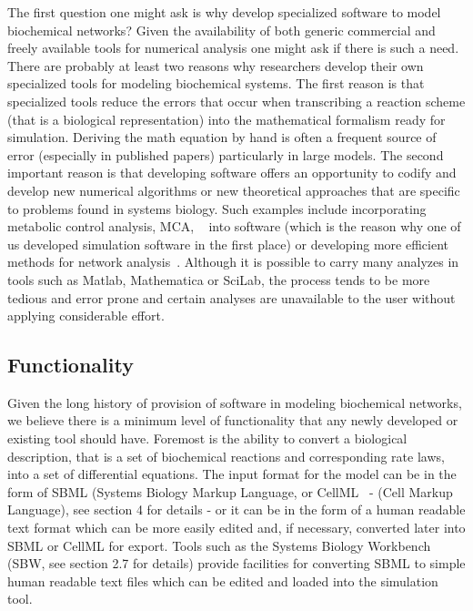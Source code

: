 \documentclass[12pt]{article}
\begin{document}
The first question one might ask is why develop specialized software
to model biochemical networks? Given the availability of both
generic commercial and freely available tools for numerical analysis
one might ask if there is such a need. There are probably at least
two reasons why researchers develop their own specialized tools for
modeling biochemical systems. The first reason is that specialized
tools reduce the errors that occur when transcribing a reaction
scheme (that is a biological representation) into the mathematical
formalism ready for simulation. Deriving the math equation by hand is often a frequent source of error (especially in published papers) particularly in large models. The second important reason is that developing software offers an opportunity to codify and develop new numerical algorithms or new theoretical approaches that are specific
to problems found in systems biology. Such examples include
incorporating metabolic control analysis, MCA, ~\citep{KB73,SaCurrTop72}
into software (which is the reason why one of us developed
simulation software in the first place) or developing more efficient
methods for network analysis~\citep{Ravi:2006}. Although it is
possible to carry many analyzes in tools such as Matlab, Mathematica
or SciLab, the process tends to be more tedious and error prone and
certain analyses are unavailable to the user without applying considerable
effort.

\subsection{Functionality}

Given the long history of provision of software in modeling
biochemical networks, we believe there is a minimum level of
functionality that any newly developed or existing tool should have.
Foremost is the ability to convert a biological description, that is
a set of biochemical reactions and corresponding rate laws, into a
set of differential equations. The input format for the model can be
in the form of SBML (Systems Biology Markup
Language, \citep{hucka:2002d} or CellML~\citep{hedley:2001b} - (Cell Markup Language), see
section 4 for details - or it can be in the form of a human readable
text format which can be more easily edited and, if necessary,
converted later into SBML or CellML for export. Tools such as the
Systems Biology Workbench (SBW, see section 2.7 for details) provide
facilities for converting SBML to simple human readable text files
which can be edited and loaded into the simulation tool.
\end{document}
